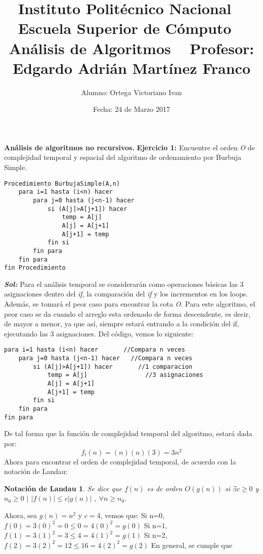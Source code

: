 \documentclass[12pt, letterpaper, twoside]{article}
\title{\textbf{Instituto Politécnico Nacional
			\vspace{10mm}	 \ \newline	
			Escuela Superior de Cómputo}
			\vspace{10mm}	 \ \newline	
			Análisis de Algoritmos
			\vspace{10mm}	 \ \newline	
			Profesor: Edgardo Adrián Martínez Franco}
\author{Alumno: Ortega Victoriano Ivan}
\date{Fecha: 24 de Marzo 2017}
\begin{document}
\begin{titlepage}
\maketitle
\end{titlepage}
\justify
\textbf{Análisis de algoritmos no recursivos.}\newline
\textbf{Ejercicio 1:} Encuentre el orden \textit{O} de complejidad temporal y espacial del algoritmo de ordenamiento por Burbuja Simple. 
\begin{lstlisting}
Procedimiento BurbujaSimple(A,n)
	para i=1 hasta (i<n) hacer
		para j=0 hasta (j<n-1) hacer
			si (A[j]>A[j+1]) hacer
				temp = A[j]
				A[j] = A[j+1]
				A[j+1] = temp
			fin si
		fin para
	fin para
fin Procedimiento
\end{lstlisting}
\justify
\textbf{\textit{Sol:}}
Para el análisis temporal se considerarán como operaciones básicas las 3 asignaciones dentro del \textit{if}, la comparación del \textit{if} y los incrementos en los loops. Además, se tomará el peor caso para encontrar la cota \textit{O}.
\newline
Para este algoritmo, el peor caso se da cuando el arreglo esta ordenado de forma descendente, es decir, de mayor a menor, ya que así, siempre estará entrando a la condición del if, ejecutando las 3 asignaciones. Del código, vemos lo siguiente:
\begin{lstlisting}
para i=1 hasta (i<n) hacer       //Compara n veces
	para j=0 hasta (j<n-1) hacer   //Compara n veces
		si (A[j]>A[j+1]) hacer       //1 comparacion
			temp = A[j]                //3 asignaciones
			A[j] = A[j+1]
			A[j+1] = temp
		fin si
	fin para
fin para
\end{lstlisting}
De tal forma que la función de complejidad temporal del algoritmo, estará dada por:
\[f_{t}(n) = (n)(n)(3) = 3n^{2}\]
Ahora para encontrar el orden de complejidad temporal, de acuerdo con la notación de Landau:
\newtheorem*{teo}{Notación de Landau}
\begin{teo}
Se dice que $f(n)$ es de orden $O(g(n))$ si
\center
$\exists c \geq 0$ y $n_{0} \geq 0$ $\mid$ $|f(n)|\leq c|g(n)|$ , $\forall n\geq n_{0}$.
\end{teo}
\justify
Ahora, sea $g(n)=n^{2}$ y $c=4$, vemos que:\newline
Si n=0,
\center$f(0)=3(0)^{2}=0\leq 0 = 4(0)^{2}=g(0)$
\justify
Si n=1,
\center$f(1)=3(1)^{2}=3\leq 4 = 4(1)^{2}=g(1)$
\justify
Si n=2,
\center$f(2)=3(2)^{2}=12\leq 16 = 4(2)^{2}=g(2)$
\justify
En general, se cumple que
\end{document}
